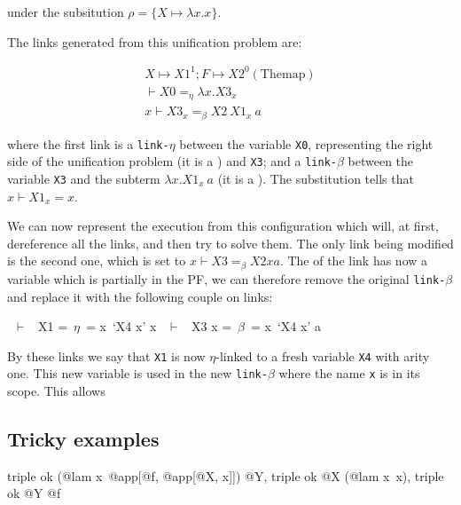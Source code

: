 \documentclass[sigconf,natbib=false,review]{acmart}
\newcommand{\linkbeta}{\texttt{link-}\ensuremath{\beta}\xspace}
\newcommand{\linketa}{\texttt{link-}\ensuremath{\eta}\xspace}
\newcommand{\linketaM}[3]{\ensuremath{#1 \vdash #2 =_\eta #3}}
\newcommand{\linkbetaM}[3]{\ensuremath{#1 \vdash #2 =_\beta #3}}
\newcommand{\substCell}[3]{\ensuremath{#1 \vdash #2 = #3}}
\newcommand{\mapping}[3]{\ensuremath{#1 \mapsto #2^#3}}
\begin{document}
\noindent
under the subsitution $\rho = \{X \mapsto \lambda x.x\}$.

\noindent
The links generated from this unification problem are:

\begin{gather}
  \mapping{X}{X1}{1}; \mapping{F}{X2}{0} (\mathrm{The map})\\
  \linketaM{}{X0}{\lambda x.X3_x}\\
  \linkbetaM{x}{X3_x}{X2 ~ X1_x ~ a}
\end{gather}

\noindent
where the first link is a \linketa between the variable \texttt{X0}, representing
the right side of the unification problem (it is a \maybeeta) and
\texttt{X3}; and a \linkbeta between the variable \texttt{X3} and the subterm
$\lambda x.X1_x ~ a$ (it is a \maybebeta).
The substitution tells that \substCell{x}{X1_x}{x}.

We can now represent the \hrun execution from this configuration which will, at
first, dereference all the links, and then try to solve them. The only link
being modified is the second one, which is set to \linkbetaM{x}{X3}{X2 x a}. The
\rhs of the link has now a variable which is partially in the PF, we can
therefore remove the original \linkbeta and replace it with the following couple
on links:

\begin{textcode}
  ~$\vdash$~ X1   =~$\eta$~= x\ `X4 x'
x ~$\vdash$~ X3 x =~$\beta$~= x\ `X4 x' a
\end{textcode}

By these links we say that \texttt{X1} is now $\eta$-linked to a fresh variable
\texttt{X4} with arity one. This new variable is used in the new \linkbeta where
the name \texttt{x} is in its scope. This allows 

\subsection{Tricky examples}

\begin{elpicode}
  triple ok (@lam x\ @app[@f, @app[@X, x]]) @Y,
  triple ok @X (@lam x\ x),
  triple ok @Y @f
\end{elpicode}

\begin{elpicode}
\end{elpicode}
\end{document}
